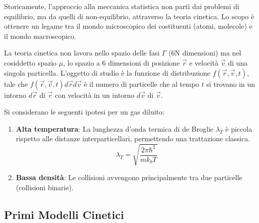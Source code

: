 Storicamente, l'approccio alla meccanica statistica non partì dai problemi di equilibrio, ma da quelli di non-equilibrio, attraverso la teoria cinetica. Lo scopo è ottenere un legame tra il mondo microscopico dei costituenti (atomi, molecole) e il mondo macroscopico.

La teoria cinetica non lavora nello spazio delle fasi $\Gamma$ (6N dimensioni) ma nel cosiddetto spazio $\mu$, lo spazio a 6 dimensioni di posizione $\vec{r}$ e velocità $\vec{v}$ di una singola particella. L'oggetto di studio è la funzione di distribuzione $f(\vec{r}, \vec{v}, t)$, tale che $f(\vec{r}, \vec{v}, t)d\vec{r}d\vec{v}$ è il numero di particelle che al tempo $t$ si trovano in un intorno $d\vec{r}$ di $\vec{r}$ con velocità in un intorno $d\vec{v}$ di $\vec{v}$.

Si considerano le seguenti ipotesi per un gas diluito:
\begin{enumerate}
    \item \textbf{Alta temperatura}: La lunghezza d'onda termica di de Broglie $\lambda_T$ è piccola rispetto alle distanze interparticellari, permettendo una trattazione classica.
    \begin{equation}
        \lambda_{T}=\sqrt{\frac{2\pi\hbar^{2}}{mk_{b}T}}
        \label{eq:deBroglie_lambda}
    \end{equation}
    \item \textbf{Bassa densità}: Le collisioni avvengono principalmente tra due particelle (collisioni binarie).
\end{enumerate}

\subsection*{Primi Modelli Cinetici}


